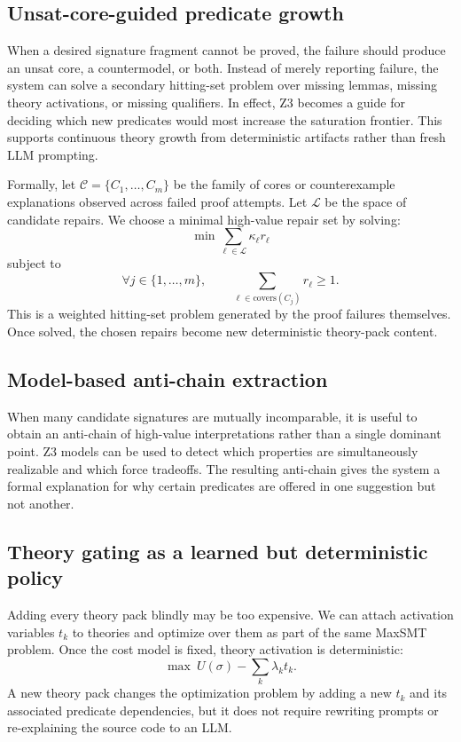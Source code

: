 \documentclass[11pt]{article}
\newcommand{\Zthree}{\textsc{Z3}}
\theoremstyle{definition}
\theoremstyle{plain}
\begin{document}
\subsection{Unsat-core-guided predicate growth}
When a desired signature fragment cannot be proved, the failure should produce an
unsat core, a countermodel, or both. Instead of merely reporting failure, the
system can solve a secondary hitting-set problem over missing lemmas, missing
theory activations, or missing qualifiers. In effect, \Zthree{} becomes a guide
for deciding which new predicates would most increase the saturation frontier.
This supports continuous theory growth from deterministic artifacts rather than
fresh LLM prompting.

Formally, let $\mathcal{C} = \{C_1, \ldots, C_m\}$ be the family of cores or
counterexample explanations observed across failed proof attempts. Let
$\mathcal{L}$ be the space of candidate repairs. We choose a minimal high-value
repair set by solving:
\[
\min \sum_{\ell \in \mathcal{L}} \kappa_\ell r_\ell
\]
subject to
\[
\forall j \in \{1,\ldots,m\}, \qquad
\sum_{\ell \in \mathrm{covers}(C_j)} r_\ell \ge 1.
\]
This is a weighted hitting-set problem generated by the proof failures
themselves. Once solved, the chosen repairs become new deterministic theory-pack
content.

\subsection{Model-based anti-chain extraction}
When many candidate signatures are mutually incomparable, it is useful to obtain
an anti-chain of high-value interpretations rather than a single dominant point.
\Zthree{} models can be used to detect which properties are simultaneously
realizable and which force tradeoffs. The resulting anti-chain gives the system a
formal explanation for why certain predicates are offered in one suggestion but
not another.

\subsection{Theory gating as a learned but deterministic policy}
Adding every theory pack blindly may be too expensive. We can attach activation
variables $t_k$ to theories and optimize over them as part of the same MaxSMT
problem. Once the cost model is fixed, theory activation is deterministic:
\[
\max \ U(\sigma) - \sum_k \lambda_k t_k.
\]
A new theory pack changes the optimization problem by adding a new $t_k$ and its
associated predicate dependencies, but it does not require rewriting prompts or
re-explaining the source code to an LLM.
\end{document}
